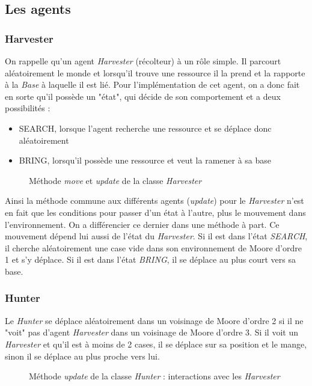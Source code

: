 \documentclass{article}
\begin{document}
\subsection{Les agents}
\subsubsection{Harvester}
On rappelle qu'un agent \emph{Harvester} (récolteur) à un rôle simple. Il parcourt aléatoirement le monde et lorsqu'il trouve une ressource
il la prend et la rapporte à la \emph{Base} à laquelle il est lié. Pour l'implémentation de cet agent, on a donc fait
en sorte qu'il possède un "état", qui décide de son comportement et a deux possibilités :
\begin{itemize}
  \item SEARCH, lorsque l'agent recherche une ressource et se déplace donc aléatoirement
  \item BRING, lorsqu'il possède une ressource et veut la ramener à sa base
\end{itemize}
\begin{figure}[!h]
  \centering
  \caption{Méthode \emph{move} et \emph{update} de la classe \emph{Harvester}}
  
\end{figure}
\vspace{8pt}
Ainsi la méthode commune aux différents agents (\emph{update}) pour le \emph{Harvester} n'est en fait que les conditions
pour passer d'un état à l'autre, plus le mouvement dans l'environnement. On a différencier ce dernier dans une méthode à part.
Ce mouvement dépend lui aussi de l'état du \emph{Harvester}. Si il est dans l'état \emph{SEARCH}, il cherche aléatoirement une case vide
dans son environnement de Moore d'ordre 1 et s'y déplace. Si il est dans l'état \emph{BRING}, il se déplace au plus court vers sa base.

\subsubsection{Hunter}
Le \emph{Hunter} se déplace aléatoirement dans un voisinage de Moore d'ordre 2 si il ne "voit" pas d'agent \emph{Harvester} dans un
voisinage de Moore d'ordre 3. Si il voit un \emph{Harvester} et qu'il est à moins de 2 cases, il se déplace sur sa position et le
mange, sinon il se déplace au plus proche vers lui.
\begin{figure}[!h]
  \centering
  \caption{Méthode \emph{update}  de la classe \emph{Hunter} : interactions avec les \emph{Harvester}}
  
\end{figure}
\end{document}
